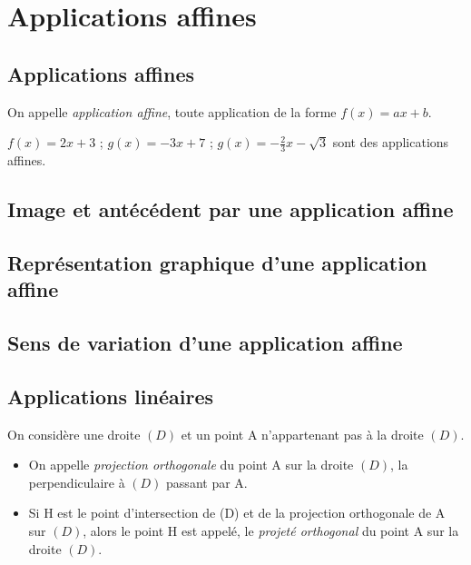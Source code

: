 \documentclass[nocrop]{sesamanuel}
\begin{document}
\chapter{Applications affines}
\cours
\section{Applications affines}
\begin{definition}
On appelle \emph{application affine}, toute application de la forme \emph{$f(x)=ax+b$}.
\begin{exemple*1}
$f(x)=2x+3$ \quad ; \quad $g(x)=-3x+7$ \quad ; \quad $g(x)=-\frac{2}{3}x-\sqrt{3}$ sont des applications affines.
\end{exemple*1}
\end{definition}

\section{Image et antécédent par une application affine}

\section{Représentation graphique d'une application affine}

\section{Sens de variation d'une application affine}

\section{Applications linéaires}
\begin{definition}
On considère une droite $(D)$ et un point A n'appartenant pas à la droite $(D)$.\\
\begin{itemize}
\item On appelle \emph{projection orthogonale} du point A sur la droite $(D)$, la perpendiculaire à $(D)$ passant par A.
\item Si H est le point d'intersection de (D) et de la projection orthogonale de A sur $(D)$, alors le point H est appelé, le \emph{projeté orthogonal} du point A sur la droite $(D)$.
\end{itemize}
\end{definition}
\end{document}
